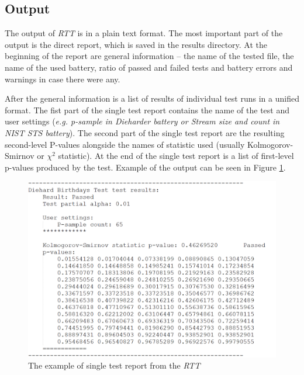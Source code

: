 \documentclass[
  digital,     %
  oneside,     %
  nosansbold,  %
  nocolorbold, %
  nolof,         %
  nolot,         %
]{fithesis4}
\begin{document}
\subsection{Output}
The output of \emph{RTT} is in a plain text format. The most important part of the output is the direct report, which is saved in the results directory. At the beginning of the report are general information -- the name of the tested file, the name of the used battery, ratio of passed and failed tests and battery errors and warnings in case there were any.

After the general information is a list of results of individual test runs in a unified format. The fist part of the single test report contains the name of the test and user settings (\emph{e.g. p-sample in Dieharder battery or Stream size and count in NIST STS battery}). The second part of the single test report are the resulting second-level P-values alongside the names of statistic used (usually Kolmogorov-Smirnov or $\chi^2$ statistic). At the end of the single test report is a list of first-level p-values produced by the test. Example of the output can be seen in Figure \ref{fig:rtt_output_example}.

\begin{figure}
  \begin{center}
    \includegraphics[width=12cm]{figures/rtt_dieharder_output.png}
  \end{center}
  \caption{The example of single test report from the \emph{RTT}}
  \label{fig:rtt_output_example}
\end{figure}
\end{document}
